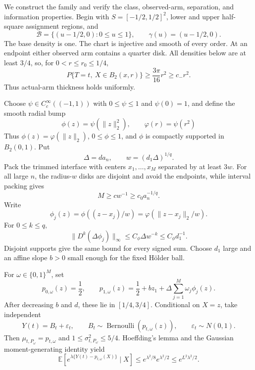 We construct the family and verify the class, observed-arm, separation, and information properties.  Begin with \(S=[-1/2,1/2]^2\), lower and upper half-square assignment regions, and
\[
 \mathcal B=\{(u-1/2,0):0\leq u\leq1\},
 \qquad \gamma(u)=(u-1/2,0).
\]
The base density is one.  The chart is injective and smooth of every order.  At an endpoint either observed arm contains a quarter disk.  All densities below are at least \(3/4\), so, for \(0<r\leq r_0\leq1/4\),
\[
 P\{T=t,\ X\in B_2(x,r)\}\geq\frac{3\pi}{16}r^2\geq c_-r^2.
\]
Thus actual-arm thickness holds uniformly.

Choose \(\psi\in C_c^\infty((-1,1))\) with \(0\leq\psi\leq1\) and \(\psi(0)=1\), and define the smooth radial bump
\[
 \phi(z)=\psi(\lVert z\rVert_2^2),
 \qquad
 \varphi(r)=\psi(r^2)
\]
Thus \(\phi(z)=\varphi(\lVert z\rVert_2)\), \(0\leq\phi\leq1\), and \(\phi\) is compactly supported in \(B_2(0,1)\).  Put
\[
 \Delta=d a_n,
 \qquad w=(d_1\Delta)^{1/q}.
\]
Pack the trimmed interface with centers \(x_1,\ldots,x_M\) separated by at least \(3w\).  For all large \(n\), the radius-\(w\) disks are disjoint and avoid the endpoints, while interval packing gives
\[
 M\geq c w^{-1}\geq c_0a_n^{-1/q}.
\]
Write
\[
 \phi_j(z)=\phi((z-x_j)/w)
 =\varphi(\lVert z-x_j\rVert_2/w).
\]
For \(0\leq k\leq q\),
\[
 \lVert D^k(\Delta\phi_j)\rVert_\infty
 \leq C_\phi\Delta w^{-k}\leq C_\phi d_1^{-1}.
\]
Disjoint supports give the same bound for every signed sum.  Choose \(d_1\) large and an affine slope \(b>0\) small enough for the fixed H\"older ball.

For \(\omega\in\{0,1\}^M\), set
\[
 p_{0,\omega}(z)=\frac12,
 \qquad
 p_{1,\omega}(z)=\frac12+bz_1
 +\Delta\sum_{j=1}^M\omega_j\phi_j(z).
\]
After decreasing \(b\) and \(d\), these lie in \([1/4,3/4]\).  Conditional on \(X=z\), take independent
\[
 Y(t)=B_t+\varepsilon_t,
 \qquad B_t\sim\operatorname{Bernoulli}(p_{t,\omega}(z)),
 \qquad \varepsilon_t\sim N(0,1).
\]
Then \(\mu_{t,P_\omega}=p_{t,\omega}\) and \(1\leq\sigma^2_{t,P_\omega}\leq5/4\).  Hoeffding's lemma and the Gaussian moment-generating identity yield
\[
 \mathbb E\!\left[e^{\lambda\{Y(t)-p_{t,\omega}(X)\}}\mid X\right]
 \leq e^{\lambda^2/8}e^{\lambda^2/2}
 \leq e^{L^2\lambda^2/2}.
\]

